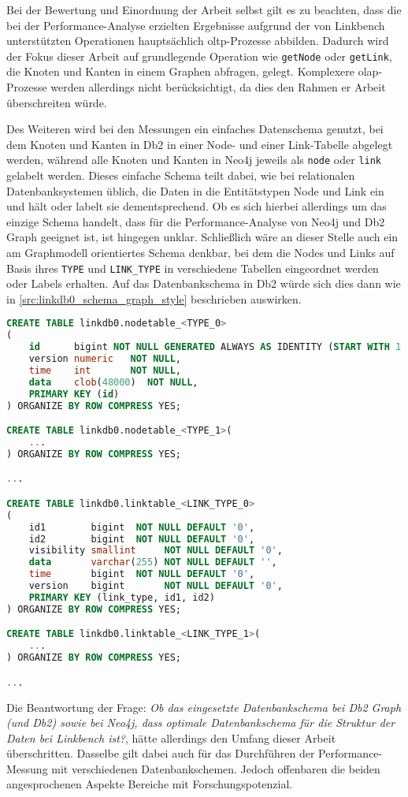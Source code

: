 Bei der Bewertung und Einordnung der Arbeit selbst gilt es zu beachten, dass die bei der Performance-Analyse erzielten Ergebnisse aufgrund der von Linkbench unterstützten Operationen hauptsächlich \acs{oltp}-Prozesse abbilden. Dadurch wird der Fokus dieser Arbeit auf grundlegende Operation wie \texttt{getNode} oder \texttt{getLink}, die Knoten und Kanten in einem Graphen abfragen, gelegt. Komplexere \acs{olap}-Prozesse werden allerdings nicht berücksichtigt, da dies den Rahmen er Arbeit überschreiten würde. 

Des Weiteren wird bei den Messungen ein einfaches Datenschema genutzt, bei dem Knoten und Kanten in Db2 in einer Node- und einer Link-Tabelle abgelegt werden, während alle Knoten und Kanten in Neo4j jeweils als \texttt{node} oder \texttt{link} gelabelt werden. Dieses einfache Schema teilt dabei, wie bei relationalen Datenbanksystemen üblich, die Daten in die Entitätstypen Node und Link ein und hält oder labelt sie dementsprechend. Ob es sich hierbei allerdings um das einzige Schema handelt, dass für die Performance-Analyse von Neo4j und Db2 Graph geeignet ist, ist hingegen unklar. Schließlich wäre an dieser Stelle auch ein am Graphmodell orientiertes Schema denkbar, bei dem die Nodes und Links auf Basis ihres \texttt{TYPE} und \texttt{LINK\_TYPE} in verschiedene Tabellen eingeordnet werden oder Labels erhalten. Auf das Datenbankschema in Db2 würde sich dies dann wie in \autoref{src:linkdb0_schema_graph_style} beschrieben auswirken. 
\begin{lstlisting}[label=src:linkdb0_schema_graph_style,caption={Alternatives Datenbankschema für Db2},language=SQL]
CREATE TABLE linkdb0.nodetable_<TYPE_0>
(
    id      bigint NOT NULL GENERATED ALWAYS AS IDENTITY (START WITH 1 INCREMENT BY 1),
    version numeric   NOT NULL,
    time    int       NOT NULL,
    data    clob(48000)  NOT NULL,
    PRIMARY KEY (id)
) ORGANIZE BY ROW COMPRESS YES;

CREATE TABLE linkdb0.nodetable_<TYPE_1>(
    ...
) ORGANIZE BY ROW COMPRESS YES;

...

CREATE TABLE linkdb0.linktable_<LINK_TYPE_0>
(
    id1        bigint  NOT NULL DEFAULT '0',
    id2        bigint  NOT NULL DEFAULT '0',
    visibility smallint     NOT NULL DEFAULT '0',
    data       varchar(255) NOT NULL DEFAULT '',
    time       bigint  NOT NULL DEFAULT '0',
    version    bigint       NOT NULL DEFAULT '0',
    PRIMARY KEY (link_type, id1, id2)
) ORGANIZE BY ROW COMPRESS YES;

CREATE TABLE linkdb0.linktable_<LINK_TYPE_1>(
    ...
) ORGANIZE BY ROW COMPRESS YES;

...
\end{lstlisting}
Die Beantwortung der Frage: \textit{Ob das eingesetzte Datenbankschema bei Db2 Graph (und Db2) sowie bei Neo4j, dass optimale Datenbankschema für die Struktur der Daten bei Linkbench ist?}, hätte allerdings den Umfang dieser Arbeit überschritten. Dasselbe gilt dabei auch für das Durchführen der Performance-Messung mit verschiedenen Datenbankschemen. Jedoch offenbaren die beiden angesprochenen Aspekte Bereiche mit Forschungspotenzial.

